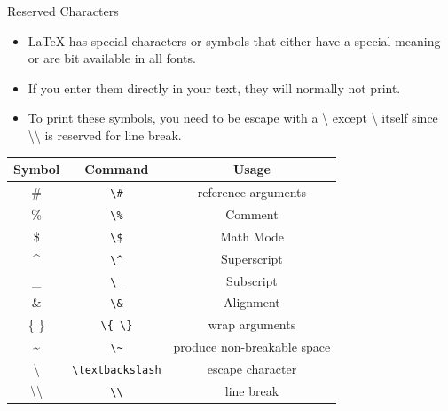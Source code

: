 \documentclass[style=lsuloni,orient=landscape]{powerdot}
\begin{document}
\begin{wideslide}[bm={Reserved Characters},method=direct]{Reserved Characters}
  \begin{itemize}
  \item LaTeX has special characters or symbols that either have a special meaning or are bit available in all fonts.
  \item If you enter them directly in your text, they will normally not print.
  \item To print these symbols, you need to be escape with a \textbackslash{} except \textbackslash{} itself since \textbackslash\textbackslash{} is reserved for line break.
  \end{itemize}
  \begin{center}
    \begin{tabular}{|ccc|}
      \hline
      Symbol & Command & Usage\\
      \hline
      \# & \verb|\#| & reference arguments \\
      \% & \verb|\%| & Comment\\
      \$ & \verb|\$| & Math Mode\\
      \^{} & \verb|\^| & Superscript\\
      \_ & \verb|\_| & Subscript\\
      \& & \verb|\&| & Alignment\\
      \{ \} & \verb|\{ \}| & wrap arguments\\
      \~{} & \verb|\~| & produce non-breakable space \\
      \textbackslash & \verb|\textbackslash| & escape character\\
      \textbackslash\textbackslash & \verb|\\| & line break\\
      \hline
    \end{tabular}
  \end{center}
\end{wideslide}
\end{document}

